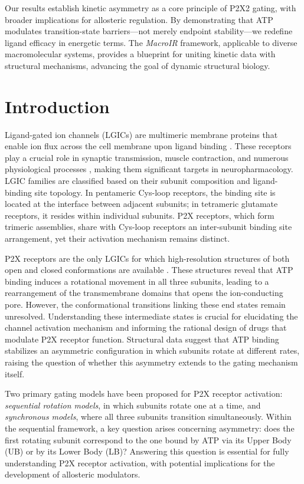 \documentclass[pdflatex,sn-mathphys-num]{sn-jnl}%
\theoremstyle{thmstyleone}%
\theoremstyle{thmstyletwo}%
\theoremstyle{thmstylethree}%
\begin{document}
Our results establish kinetic asymmetry as a core principle of P2X2 gating, with broader implications for allosteric regulation. By demonstrating that ATP modulates transition-state barriers—not merely endpoint stability—we redefine ligand efficacy in energetic terms. The \textit{MacroIR} framework, applicable to diverse macromolecular systems, provides a blueprint for uniting kinetic data with structural mechanisms, advancing the goal of dynamic structural biology.


\section{Introduction}
\label{sec1}

Ligand-gated ion channels (LGICs) are multimeric membrane proteins that enable ion flux across the cell membrane upon ligand binding \cite{p2x_cuerpo_humano}. These receptors play a crucial role in synaptic transmission, muscle contraction, and numerous physiological processes \cite{p2x_drugs,therapeutic,p2x7_pharmacology}, making them significant targets in neuropharmacology. LGIC families are classified based on their subunit composition and ligand-binding site topology. In pentameric Cys-loop receptors, the binding site is located at the interface between adjacent subunits; in tetrameric glutamate receptors, it resides within individual subunits. P2X receptors, which form trimeric assemblies, share with Cys-loop receptors an inter-subunit binding site arrangement, yet their activation mechanism remains distinct.

P2X receptors are the only LGICs for which high-resolution structures of both open and closed conformations are available \cite{cerrada_p2x,abierta_p2x,estructura_p2x1}. These structures reveal that ATP binding induces a rotational movement in all three subunits, leading to a rearrangement of the transmembrane domains that opens the ion-conducting pore. However, the conformational transitions linking these end states remain unresolved. Understanding these intermediate states is crucial for elucidating the channel activation mechanism and informing the rational design of drugs that modulate P2X receptor function. Structural data suggest that ATP binding stabilizes an asymmetric configuration in which subunits rotate at different rates, raising the question of whether this asymmetry extends to the gating mechanism itself.

Two primary gating models have been proposed for P2X receptor activation: \textit{sequential rotation models}, in which subunits rotate one at a time, and \textit{synchronous models}, where all three subunits transition simultaneously. Within the sequential framework, a key question arises concerning asymmetry: does the first rotating subunit correspond to the one bound by ATP via its Upper Body (UB) or by its Lower Body (LB)? Answering this question is essential for fully understanding P2X receptor activation, with potential implications for the development of allosteric modulators.
\end{document}
